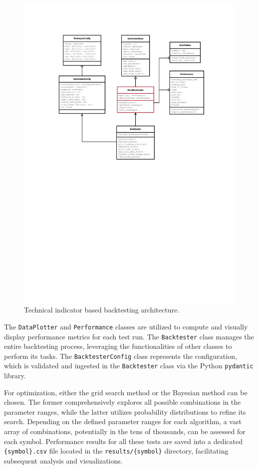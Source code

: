 \begin{figure}[ht!]
\centering
\includegraphics[page=1, trim=30mm 135mm 0 25mm, width=1.1\textwidth, clip]{./pdf/backtester_uml.pdf}
\caption{Technical indicator based backtesting architecture.}
\label{fig:tech_indicator_arch}
\end{figure}

The \texttt{DataPlotter} and \texttt{Performance} classes are utilized to compute and visually display performance metrics for each test run.
The \texttt{Backtester} class manages the entire backtesting process, leveraging the functionalities of other classes to perform its tasks.
The \texttt{BacktesterConfig} class represents the configuration, which is validated and ingested in the \texttt{Backtester} class via the Python \texttt{pydantic} library.

For optimization, either the grid search method or the Bayesian method can be chosen. The former comprehensively explores all possible combinations in the parameter ranges,
while the latter utilizes probability distributions to refine its search. Depending on the defined parameter ranges for each algorithm, a vast array of combinations, potentially
in the tens of thousands, can be assessed for each symbol. Performance results for all these tests are saved into a dedicated \texttt{\{symbol\}.csv} file
located in the \texttt{results/\{symbol\}} directory, facilitating subsequent analysis and visualizations.


